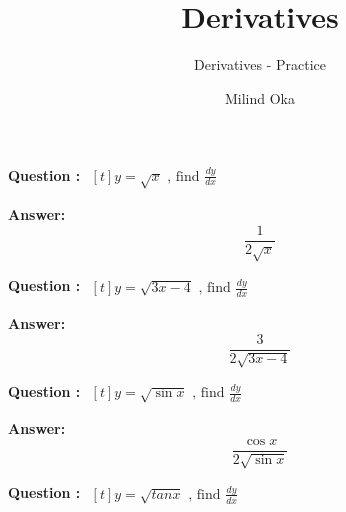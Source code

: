 \documentclass{beamer}
\title{Derivatives}
\subtitle{Derivatives - Practice}
\author{Milind Oka}
\begin{document}
 

\frame {
		\titlepage
	}

\huge

\frame
{
\textbf{Question :} 
$\begin{aligned}[t] 
y= \sqrt{x}  \text{\ , \  \ find \ \  } \frac{dy}{dx}
\end{aligned}$

}



\frame
{
\textbf{Answer:}
\begin{equation} \nonumber
\frac{1}{2\sqrt{x}}
\end{equation}

}


\frame
{
\textbf{Question :} 
$\begin{aligned}[t] 
y= \sqrt{3x-4}  \text{\ , \  \ find \ \  } \frac{dy}{dx}
\end{aligned}$
}


\frame
{
\textbf{Answer:}
\begin{equation} \nonumber
\frac{3}{2\sqrt{3x-4}}
\end{equation}

}
\frame
{
\textbf{Question :} 
$\begin{aligned}[t] 
y= \sqrt{\sin x}  \text{\ , \  \ find \ \  } \frac{dy}{dx}
\end{aligned}$
}


\frame
{
\textbf{Answer:}
\begin{equation} \nonumber
\frac{\cos x}{2\sqrt{\sin x}}
\end{equation}

}




\frame
{
\textbf{Question :} 
$\begin{aligned}[t] 
y= \sqrt{tan x}  \text{\ , \  \ find \ \  } \frac{dy}{dx}
\end{aligned}$
}
\end{document}
